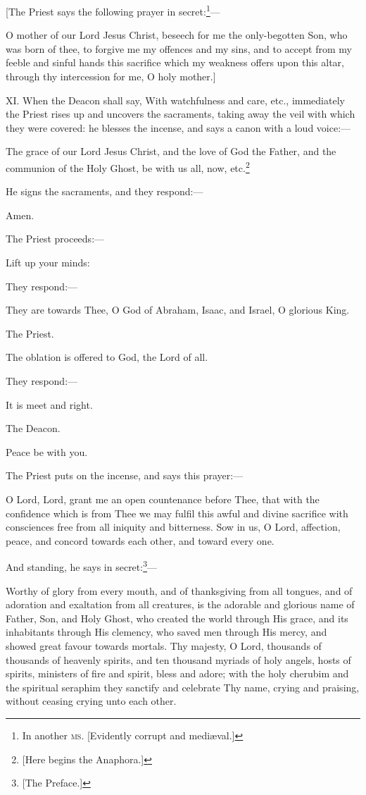 [The Priest says the following prayer in secret:\footnote{\par  In another \textsc{ms}. [Evidently corrupt and mediæval.]}—

O mother of our Lord Jesus Christ, beseech for me the only-begotten Son, who was born of thee, to forgive me my offences and my sins, and to accept from my feeble and sinful hands this sacrifice which my weakness offers upon this altar, through thy intercession for me, O holy mother.]

XI. When the Deacon shall say, With watchfulness and care, etc., immediately the Priest rises up and uncovers the sacraments, taking away the veil with which they were covered: he blesses the incense, and says a canon with a loud voice:—

The grace of our Lord Jesus Christ, and the love of God the Father, and the communion of the Holy Ghost, be with us all, now, etc.\footnote{\par{}  [Here begins the Anaphora.]}

He signs the sacraments, and they respond:—

Amen.

The Priest proceeds:—

Lift up your minds:

They respond:—

They are towards Thee, O God of Abraham, Isaac, and Israel, O glorious King.

The Priest.

The oblation is offered to God, the Lord of all.

They respond:—

It is meet and right.

The Deacon.

Peace be with you.

The Priest puts on the incense, and says this prayer:—

O Lord, Lord, grant me an open countenance before Thee, that with the confidence which is from Thee we may fulfil this awful and divine sacrifice with consciences free from all iniquity and bitterness. Sow in us, O Lord, affection, peace, and concord towards each other, and toward every one.

And standing, he says in secret:\footnote{\par{}  [The Preface.]}—

Worthy of glory from every mouth, and of thanksgiving from all tongues, and of adoration and exaltation from all creatures, is the adorable and glorious name of Father, Son, and Holy Ghost, who created the world through His grace, and its inhabitants through His clemency, who saved men through His mercy, and showed great favour towards mortals. Thy majesty, O Lord, thousands of thousands of heavenly spirits, and ten thousand myriads of holy angels, hosts of spirits, ministers of fire and spirit, bless and adore; with the holy cherubim and the spiritual seraphim they sanctify and celebrate Thy name, crying and praising, without ceasing crying unto each other.

